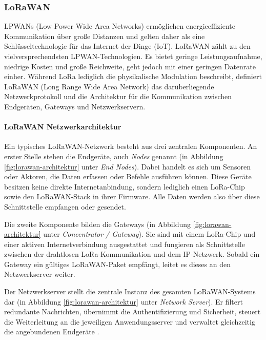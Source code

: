 \subsubsection*{LoRaWAN} 
\label{sec:lorawan}

LPWANs (Low Power Wide Area Networks) ermöglichen energieeffiziente Kommunikation über große Distanzen und gelten daher als eine Schlüsseltechnologie für das Internet der Dinge (IoT). LoRaWAN zählt zu den vielversprechendsten LPWAN-Technologien. Es bietet geringe Leistungsaufnahme, niedrige Kosten und große Reichweite, geht jedoch mit einer geringen Datenrate einher. Während LoRa lediglich die physikalische Modulation beschreibt, definiert LoRaWAN (Long Range Wide Area Network) das darüberliegende Netzwerkprotokoll und die Architektur für die Kommunikation zwischen Endgeräten, Gateways und Netzwerkservern.

\paragraph*{LoRaWAN Netzwerkarchitektur}
Ein typisches LoRaWAN-Netzwerk besteht aus drei zentralen Komponenten. An erster Stelle stehen die Endgeräte, auch \textit{Nodes} genannt (in Abbildung \ref{fig:lorawan-architektur} unter \textit{End Nodes}). Dabei handelt es sich um Sensoren oder Aktoren, die Daten erfassen oder Befehle ausführen können. Diese Geräte besitzen keine direkte Internetanbindung, sondern lediglich einen LoRa-Chip sowie den LoRaWAN-Stack in ihrer Firmware. Alle Daten werden also über diese Schnittstelle empfangen oder gesendet.

Die zweite Komponente bilden die Gateways (in Abbildung \ref{fig:lorawan-architektur} unter \textit{Concentrator / Gateway}). Sie sind mit einem LoRa-Chip und einer aktiven Internetverbindung ausgestattet und fungieren als Schnittstelle zwischen der drahtlosen LoRa-Kommunikation und dem IP-Netzwerk. Sobald ein Gateway ein gültiges LoRaWAN-Paket empfängt, leitet es dieses an den Netzwerkserver weiter.

Der Netzwerkserver stellt die zentrale Instanz des gesamten LoRaWAN-Systems dar (in Abbildung \ref{fig:lorawan-architektur} unter \textit{Network Server}). Er filtert redundante Nachrichten, übernimmt die Authentifizierung und Sicherheit, steuert die Weiterleitung an die jeweiligen Anwendungsserver und verwaltet gleichzeitig die angebundenen Endgeräte \cite{LoRaWANArchitecture}.

